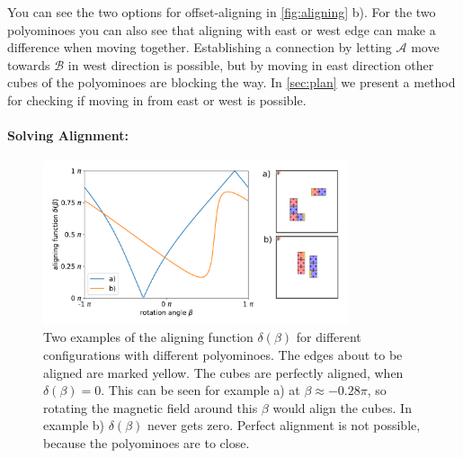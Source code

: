 You can see the two options for offset-aligning in \autoref{fig:aligning} b).
For the two polyominoes you can also see that aligning with east or west edge can make a difference when moving together.
Establishing a connection by letting $\mathcal{A}$ move towards $\mathcal{B}$ in west direction is possible, but by moving in east direction other cubes of the polyominoes are blocking the way.
In \autoref{sec:plan} we present a method for checking if moving in from east or west is possible. 

\paragraph{Solving Alignment:}

\begin{figure}
	\centering
	\includegraphics[width=0.8\textwidth]{figures/plots/aligning_function.pdf}
	\caption[Examples of aligning functions $\delta(\beta)$]{Two examples of the aligning function $\delta(\beta)$ for different configurations with different polyominoes.
		The edges about to be aligned are marked yellow.
		The cubes are perfectly aligned, when $\delta(\beta) = 0$.
		This can be seen for example a) at $\beta \approx -0.28\pi$, so rotating the magnetic field around this $\beta$ would align the cubes.
		In example b) $\delta(\beta)$ never gets zero.
		Perfect alignment is not possible, because the polyominoes are to close.}
	\label{fig:aligning_plot}
\end{figure}

